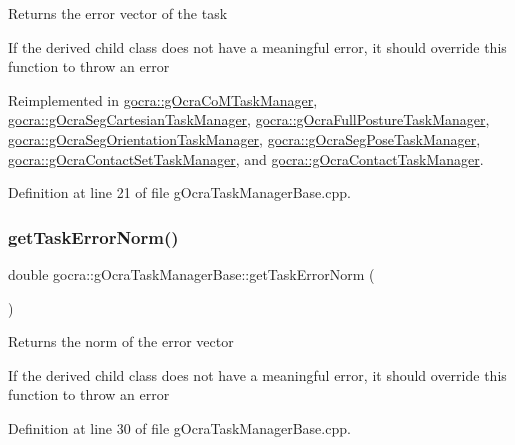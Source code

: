 Returns the error vector of the task

If the derived child class does not have a meaningful error, it should override this function to throw an error 

Reimplemented in \hyperlink{classgocra_1_1gOcraCoMTaskManager_a48cd88dc2fa3db834d3d4a17d39a8c30}{gocra\+::g\+Ocra\+Co\+M\+Task\+Manager}, \hyperlink{classgocra_1_1gOcraSegCartesianTaskManager_a12418bbcfafcc5f7aab8b6f8013880a4}{gocra\+::g\+Ocra\+Seg\+Cartesian\+Task\+Manager}, \hyperlink{classgocra_1_1gOcraFullPostureTaskManager_a8be4aac1fe7ec4f68e31f72a8aab6af8}{gocra\+::g\+Ocra\+Full\+Posture\+Task\+Manager}, \hyperlink{classgocra_1_1gOcraSegOrientationTaskManager_a37aa69c90bd5d3d0318de77aa56cd4dd}{gocra\+::g\+Ocra\+Seg\+Orientation\+Task\+Manager}, \hyperlink{classgocra_1_1gOcraSegPoseTaskManager_a059b69af0a960110bb14863f0179b1cd}{gocra\+::g\+Ocra\+Seg\+Pose\+Task\+Manager}, \hyperlink{classgocra_1_1gOcraContactSetTaskManager_aa0136e8702029873ba4d82c0edc7c571}{gocra\+::g\+Ocra\+Contact\+Set\+Task\+Manager}, and \hyperlink{classgocra_1_1gOcraContactTaskManager_a50ef70ceb95ced6818a5990fa6615d6a}{gocra\+::g\+Ocra\+Contact\+Task\+Manager}.



Definition at line 21 of file g\+Ocra\+Task\+Manager\+Base.\+cpp.

\hypertarget{classgocra_1_1gOcraTaskManagerBase_ab38cda0adc96728270cc881d83644fda}{}\label{classgocra_1_1gOcraTaskManagerBase_ab38cda0adc96728270cc881d83644fda} 
\subsubsection{\texorpdfstring{get\+Task\+Error\+Norm()}{getTaskErrorNorm()}}
{\footnotesize\ttfamily double gocra\+::g\+Ocra\+Task\+Manager\+Base\+::get\+Task\+Error\+Norm (\begin{DoxyParamCaption}{ }\end{DoxyParamCaption})}

Returns the norm of the error vector

If the derived child class does not have a meaningful error, it should override this function to throw an error 

Definition at line 30 of file g\+Ocra\+Task\+Manager\+Base.\+cpp.



